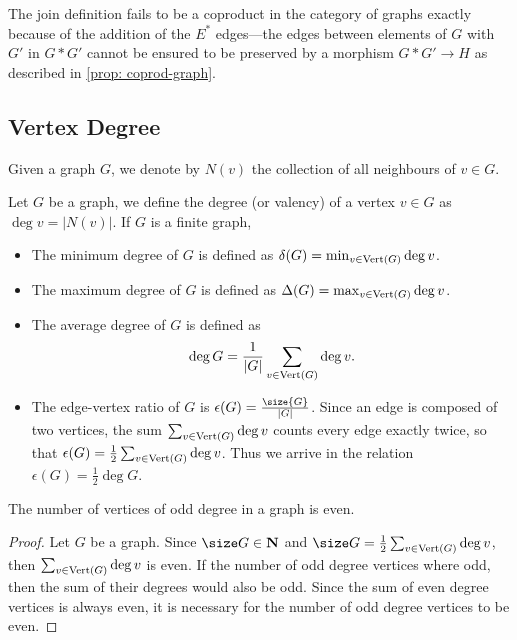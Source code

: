 The join definition fails to be a coproduct in the category of graphs exactly
because of the addition of the \(E^*\) edges---the edges between elements of
\(G\) with \(G'\) in \({G * G'}\) cannot be ensured to be preserved by a morphism
\(G * G' \to H\) as described in \cref{prop: coprod-graph}.

\subsection{Vertex Degree}

\begin{notation}[Neighbourhood]
Given a graph \(G\), we denote by \(N(v)\) the collection of all neighbours of
\(v \in G\).
\end{notation}

\begin{definition}[Degree]\label{def: degree}
Let \(G\) be a graph, we define the degree (or valency) of a vertex \(v \in
G\) as \(\deg v = |N(v)|\). If \(G\) is a finite graph,
\begin{itemize}
  \setlength\itemsep{0em}
  \item The minimum degree of \(G\) is defined as \(\delta(G) = \min_{v \in
    \operatorname{Vert}(G)} \deg v\).
  \item The maximum degree of \(G\) is defined as \(\Delta(G) = \max_{v \in
    \operatorname{Vert}(G)} \deg v\).
  \item The average degree of \(G\) is defined as
    \[
      \deg G = \frac 1 {|G|} \sum_{v \in \operatorname{Vert}(G)} \deg v.
    \]
  \item The edge-vertex ratio of \(G\) is \(\epsilon(G) =
    \frac{\size{G}}{|G|}\). Since an edge is composed of two vertices, the sum
    \(\sum_{v \in \operatorname{Vert}(G)} \deg v\) counts every edge exactly twice, so that
    \(\epsilon(G) = \frac 1 2 \sum_{v \in \operatorname{Vert}(G)} \deg v\). Thus we arrive in
    the relation \(\epsilon(G) = \frac 1 2 \deg G\).
\end{itemize}
\end{definition}

\begin{lemma}\label{lem: handshaking}
The number of vertices of odd degree in a graph is even.
\end{lemma}

\begin{proof}
Let \(G\) be a graph. Since \(\size G \in \N\) and \(\size G = \frac 1 2
\sum_{v \in \Vertex(G)} \deg v\), then \(\sum_{v \in \operatorname{Vert}(G)} \deg v\) is even. If the
number of odd degree vertices where odd, then the sum of their degrees would
also be odd. Since the sum of even degree vertices is always even, it is
necessary for the number of odd degree vertices to be even.
\end{proof}

